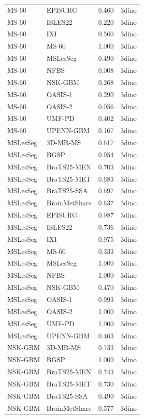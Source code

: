 \begin{tabular}{llrl}
MS-60 & EPISURG & 0.460 & 3dino \\
MS-60 & ISLES22 & 0.220 & 3dino \\
MS-60 & IXI & 0.560 & 3dino \\
MS-60 & MS-60 & 1.000 & 3dino \\
MS-60 & MSLesSeg & 0.490 & 3dino \\
MS-60 & NFBS & 0.008 & 3dino \\
MS-60 & NSK-GBM & 0.268 & 3dino \\
MS-60 & OASIS-1 & 0.290 & 3dino \\
MS-60 & OASIS-2 & 0.056 & 3dino \\
MS-60 & UMF-PD & 0.402 & 3dino \\
MS-60 & UPENN-GBM & 0.167 & 3dino \\
MSLesSeg & 3D-MR-MS & 0.617 & 3dino \\
MSLesSeg & BGSP & 0.954 & 3dino \\
MSLesSeg & BraTS25-MEN & 0.703 & 3dino \\
MSLesSeg & BraTS25-MET & 0.683 & 3dino \\
MSLesSeg & BraTS25-SSA & 0.697 & 3dino \\
MSLesSeg & BrainMetShare & 0.637 & 3dino \\
MSLesSeg & EPISURG & 0.987 & 3dino \\
MSLesSeg & ISLES22 & 0.736 & 3dino \\
MSLesSeg & IXI & 0.975 & 3dino \\
MSLesSeg & MS-60 & 0.333 & 3dino \\
MSLesSeg & MSLesSeg & 1.000 & 3dino \\
MSLesSeg & NFBS & 1.000 & 3dino \\
MSLesSeg & NSK-GBM & 0.470 & 3dino \\
MSLesSeg & OASIS-1 & 0.993 & 3dino \\
MSLesSeg & OASIS-2 & 1.000 & 3dino \\
MSLesSeg & UMF-PD & 1.000 & 3dino \\
MSLesSeg & UPENN-GBM & 0.463 & 3dino \\
NSK-GBM & 3D-MR-MS & 0.733 & 3dino \\
NSK-GBM & BGSP & 1.000 & 3dino \\
NSK-GBM & BraTS25-MEN & 0.743 & 3dino \\
NSK-GBM & BraTS25-MET & 0.730 & 3dino \\
NSK-GBM & BraTS25-SSA & 0.490 & 3dino \\
NSK-GBM & BrainMetShare & 0.577 & 3dino \\

\end{tabular}
